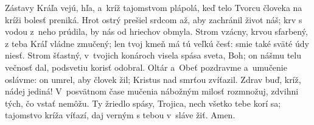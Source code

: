 Zástavy Kráľa vejú, hľa,
a~kríž tajomstvom plápolá,
keď telo Tvorcu človeka
na kríži bolesť preniká.
\versseparator
Hrot ostrý prešiel srdcom až,
aby zachránil život náš;
krv s vodou z~neho prúdila,
by nás od hriechov obmyla.
\versseparator
Strom vzácny, krvou sfarbený,
z teba Kráľ vládne zmučený;
len tvoj kmeň má tú veľkú česť:
smie také sväté údy niesť.
\versseparator
Strom šťastný, v~tvojich konároch
visela spása sveta, Boh;
on nášmu telu večnosť dal,
podsvetiu korisť odobral.
\versseparator
Oltár a~Obeť pozdravme
a~umučenie oslávme:
on umrel, aby človek žil;
Kristus nad smrťou zvíťazil.
\versseparator
Zdrav buď, kríž, nádej jediná!
V~posvätnom čase mučenia
nábožným milosť rozmnožuj,
zdvihni tých, čo vstať nemôžu.
\versseparator
Ty žriedlo spásy, Trojica,
nech všetko tebe korí sa;
tajomstvo kríža víťazí,
daj verným s tebou v~sláve žiť. Amen.